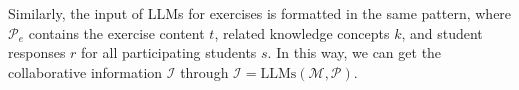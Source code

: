 Similarly, the input of LLMs for exercises is formatted in the same pattern, where $\mathcal{P}_e$ contains the exercise content $t$, related knowledge concepts $k$, and student responses $r$ for all participating students $s$.
In this way, we can get the collaborative information $\mathcal{I}$ through $\mathcal{I}=\text{LLMs}\left(\mathcal{M}, \mathcal{P}\right)$.

